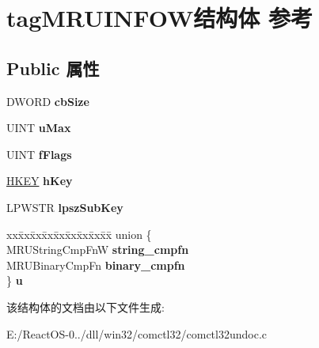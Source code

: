 \hypertarget{structtag_m_r_u_i_n_f_o_w}{}\section{tag\+M\+R\+U\+I\+N\+F\+O\+W结构体 参考}
\label{structtag_m_r_u_i_n_f_o_w}
\subsection*{Public 属性}
\begin{DoxyCompactItemize}
\item 
\mbox{\label{structtag_m_r_u_i_n_f_o_w_abafd0343f157140d3c352aba1c145bf3}} 
D\+W\+O\+RD {\bfseries cb\+Size}
\item 
\mbox{\label{structtag_m_r_u_i_n_f_o_w_a3045a8c8423ee0ece7e2e358698f3e08}} 
U\+I\+NT {\bfseries u\+Max}
\item 
\mbox{\label{structtag_m_r_u_i_n_f_o_w_a287dc1435f3710ba72154cd831b51cc6}} 
U\+I\+NT {\bfseries f\+Flags}
\item 
\mbox{\label{structtag_m_r_u_i_n_f_o_w_a7e8fd2998c5845b1526cdd7cc761db27}} 
\hyperlink{interfacevoid}{H\+K\+EY} {\bfseries h\+Key}
\item 
\mbox{\label{structtag_m_r_u_i_n_f_o_w_ac77ca171d5f03eb42fcb60c9161d7d3e}} 
L\+P\+W\+S\+TR {\bfseries lpsz\+Sub\+Key}
\item 
\mbox{\label{structtag_m_r_u_i_n_f_o_w_a5999c90f9b5cc2adab0df8c67acd1f26}} 
\begin{tabbing}
xx\=xx\=xx\=xx\=xx\=xx\=xx\=xx\=xx\=\kill
union \{\\
\>MRUStringCmpFnW {\bfseries string\_cmpfn}\\
\>MRUBinaryCmpFn {\bfseries binary\_cmpfn}\\
\} {\bfseries u}\\

\end{tabbing}\end{DoxyCompactItemize}


该结构体的文档由以下文件生成\+:\begin{DoxyCompactItemize}
\item 
E\+:/\+React\+O\+S-\/0../dll/win32/comctl32/comctl32undoc.\+c\end{DoxyCompactItemize}

